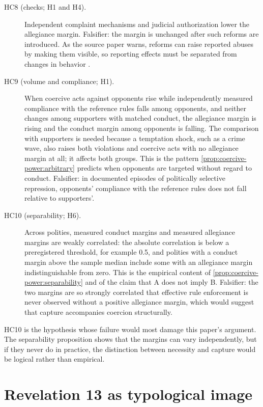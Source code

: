 \documentclass[11pt,letterpaper]{article}
\theoremstyle{definition}
\theoremstyle{remark}
\begin{document}
\begin{description}
\item[HC8 (checks; H1 and H4).] Independent complaint mechanisms and judicial authorization lower the allegiance margin. Falsifier: the margin is unchanged after such reforms are introduced. As the source paper warns, reforms can raise reported abuses by making them visible, so reporting effects must be separated from changes in behavior \citep{largo2026hbs}.
\item[HC9 (volume and compliance; H1).] When coercive acts against opponents rise while independently measured compliance with the reference rules falls among opponents, and neither changes among supporters with matched conduct, the allegiance margin is rising and the conduct margin among opponents is falling. The comparison with supporters is needed because a temptation shock, such as a crime wave, also raises both violations and coercive acts with no allegiance margin at all; it affects both groups. This is the pattern \cref{prop:coercive-power:arbitrary} predicts when opponents are targeted without regard to conduct. Falsifier: in documented episodes of politically selective repression, opponents' compliance with the reference rules does not fall relative to supporters'.
\item[HC10 (separability; H6).] Across polities, measured conduct margins and measured allegiance margins are weakly correlated: the absolute correlation is below a preregistered threshold, for example 0.5, and polities with a conduct margin above the sample median include some with an allegiance margin indistinguishable from zero. This is the empirical content of \cref{prop:coercive-power:separability} and of the claim that A does not imply B. Falsifier: the two margins are so strongly correlated that effective rule enforcement is never observed without a positive allegiance margin, which would suggest that capture accompanies coercion structurally.
\end{description}

HC10 is the hypothesis whose failure would most damage this paper's argument. The separability proposition shows that the margins can vary independently, but if they never do in practice, the distinction between necessity and capture would be logical rather than empirical.

\section{Revelation 13 as typological image}
\label{sec:revelation}
\end{document}
